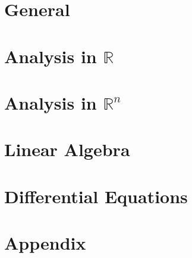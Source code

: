 %
%





\maketitle
\tableofcontents
\part{General}




\part{Analysis in $\mathbb{R}$}
 







\part{Analysis in $\mathbb{R}^n$}



\part{Linear Algebra}

\part{Differential Equations}








\part{Appendix}


\printindex

